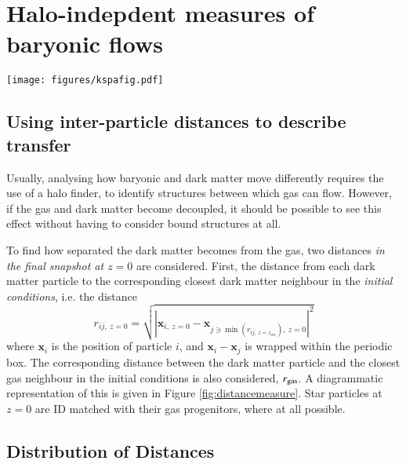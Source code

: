\section{Halo-indepdent measures of baryonic flows}
\label{sec:haloindependent}

\begin{figure*} \centering
	\texttt{[image: figures/kspafig.pdf]} \caption{A
	diagrammatic representation of the distance measure. On the left, the
	initial conditions are shown. The blue dark matter particles each find
	their closest dark matter and gas (red) neighbour. These particles are
    then tracked to the final state of the simulation at z=0 (right) and the
    distance between them calculated again to assess the relative motion of dark
    matter and baryons.} \label{fig:distancemeasure}
\end{figure*}

\subsection{Using inter-particle distances to describe transfer}

Usually, analysing how baryonic and dark matter move differently requires the
use of a halo finder, to identify structures between which gas can flow.
However, if the gas and dark matter become decoupled, it should be possible to
see this effect without having to consider bound structures at all.

To find how separated the dark matter becomes from the gas, two distances
\emph{in the final snapshot at $z=0$} are considered. First, the distance
from each dark matter particle to the corresponding closest dark matter
neighbour in the \emph{initial conditions}, i.e. the distance
\begin{equation}
    r_{ij, ~z=0} = \sqrt{ \left| \mathbf{x}_{i,
    ~z=0} - \mathbf{x}_{j \ni \min(r_{ij, ~z=z_{ini}}), ~z=0} \right|^2 }
    \label{eqn:minimal}
\end{equation}
where $\mathbf{x}_i$ is the position of particle $i$, and $\mathbf{x}_i -
\mathbf{x}_j$ is wrapped within the periodic box. The corresponding distance
between the dark matter particle and the closest gas neighbour in the initial
conditions is also considered, $r_{\rm gas}$. A diagrammatic representation of
this is given in Figure \ref{fig:distancemeasure}. Star particles at $z=0$ are
ID matched with their gas progenitors, where at all possible. 

\subsection{Distribution of Distances}


